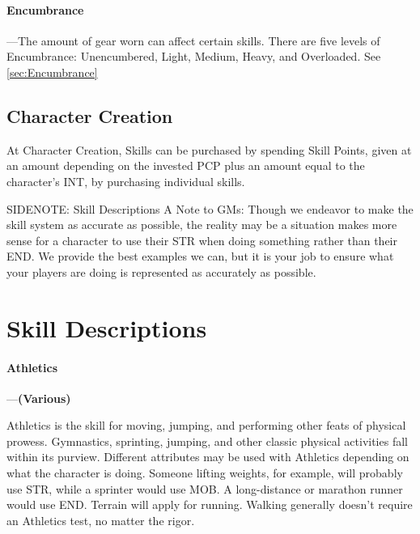 \documentclass[oneside,11pt,english]{book}
\begin{document}
\paragraph{Encumbrance}
---\quad The amount of gear worn can affect certain skills. There are five levels of Encumbrance: Unencumbered, Light, Medium, Heavy, and Overloaded. See \autoref{sec:Encumbrance}

\subsection{Character Creation}
At Character Creation, Skills can be purchased by spending Skill Points, given
at an amount depending on the invested PCP plus an amount equal to the
character’s INT, by purchasing individual skills. 

SIDENOTE: Skill Descriptions %
A Note to GMs: Though we endeavor to make the skill system as accurate as possible, the reality may be 
a situation makes more sense for a character to use their STR when doing something rather than their 
END. We provide the best examples we can, but it is your job to ensure what your players are doing is 
represented as accurately as possible. 

\section{Skill Descriptions}
\paragraph{\label{skill:Athletics}Athletics}---\quad\textbf{(Various)}\par%
Athletics is the skill for moving, jumping, and performing other feats of
physical prowess. Gymnastics, sprinting, jumping, and other classic physical
activities fall within its purview. Different attributes may be used with
Athletics depending on what the character is doing. Someone lifting weights, for
example, will probably use STR, while a sprinter would use MOB. A long-distance
or marathon runner would use END. Terrain will apply for running. Walking
generally doesn’t require an Athletics test, no matter the rigor. 
\end{document}
